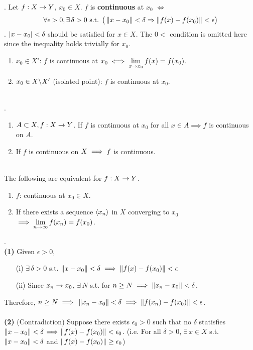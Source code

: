 . Let $f: X\rightarrow Y$, $x_0\in X$. $f$ is \textbf{continuous} at $x_0$ $\iff$ $$\forall \epsilon>0, \exists\,\delta>0 \text{ s.t. } \big(\left\lVert x-x_0\right\rVert < \delta \Rightarrow \left\lVert f(x) - f(x_0)\right\rVert < \epsilon\big)$$
\rmk. $\left|x - x_0\right| < \delta$ should be satisfied for $x\in X$. The $0 <$ condition is omitted here since the inequality holds trivially for $x_0$.
\begin{enumerate}
	\item $x_0\in X'$: $f$ is continuous at $x_0 \iff \displaystyle \lim_{x\rightarrow x_0} f(x) = f(x_0)$.
	\item $x_0\in X \backslash X'$ (isolated point): $f$ is continuous at $x_0$. 
\end{enumerate}~\\
.
\begin{enumerate}
	\item $A\subset X, f:X\rightarrow Y$. If $f$ is continuous at $x_0$ for all $x\in A \implies f$ is continuous on $A$.
	\item If $f$ is continuous on $X \implies f$ is continuous.
\end{enumerate}~\\
 The following are equivalent for $f:X\rightarrow Y$.
\begin{enumerate}
	\item $f$: continuous at $x_0\in X$.
	\item If there exists a sequence $\left\langle x_n \right\rangle$ in $X$ converging to $x_0$ $\implies\displaystyle \lim_{n\rightarrow\infty} f(x_n) = f(x_0)$.
\end{enumerate}
\pf.\\
\textbf{(1)} Given $\epsilon >0$,
\begin{enumerate}
	\item[(i)] $\exists\, \delta>0$ s.t. $\left\lVert x-x_0\right\rVert < \delta \implies \left\lVert f(x) - f(x_0)\right\rVert < \epsilon$
	\item[(ii)] Since $x_n\rightarrow x_0$, $\exists\, N$ s.t. for $n\geq N \implies \left\lVert x_n-x_0\right\rVert < \delta$.
\end{enumerate}
Therefore, $n\geq N \implies$ $\left\lVert x_n-x_0\right\rVert < \delta \implies \left\lVert f(x_n) - f(x_0)\right\rVert < \epsilon$.\\
\\
\textbf{(2)} (Contradiction) Suppose there exists $\epsilon_0 > 0$ such that no $\delta$ statisfies $\left\lVert x-x_0\right\rVert < \delta \!\implies\! \left\lVert f(x) - f(x_0)\right\rVert < \epsilon_0$. (i.e. For all $\delta> 0$, $\exists\, x\in X$ s.t. $\left\lVert x - x_0\right\rVert < \delta$ and $\left\lVert f(x) - f(x_0)\right\rVert \geq \epsilon_0$)\\
\\
